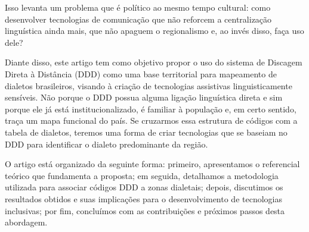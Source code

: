 \begin{flushleft}
Isso levanta um problema que é político ao mesmo tempo cultural: como desenvolver tecnologias de comunicação que não reforcem a centralização linguística ainda mais, que não apaguem o regionalismo e, ao invés disso, faça uso dele?

Diante disso, este artigo tem como objetivo propor o uso do sistema de Discagem Direta à Distância (DDD) como uma base territorial para mapeamento de dialetos brasileiros, visando à criação de tecnologias assistivas linguisticamente sensíveis. Não porque o DDD possua alguma ligação linguística direta e sim porque ele já está institucionalizado, é familiar à população e, em certo sentido, traça um mapa funcional do país. Se cruzarmos essa estrutura de códigos com a tabela de dialetos, teremos uma forma de criar tecnologias que se baseiam no DDD para identificar o dialeto predominante da região.

O artigo está organizado da seguinte forma: primeiro, apresentamos o referencial teórico que fundamenta a proposta; em seguida, detalhamos a metodologia utilizada para associar códigos DDD a zonas dialetais; depois, discutimos os resultados obtidos e suas implicações para o desenvolvimento de tecnologias inclusivas; por fim, concluímos com as contribuições e próximos passos desta abordagem.
	
\end{flushleft}


